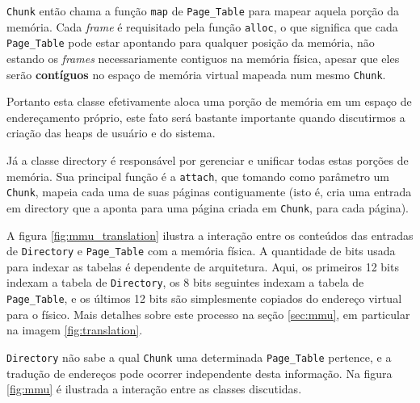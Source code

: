 \verb+Chunk+ então chama a função \verb+map+ de \verb+Page_Table+ para mapear aquela porção da memória. Cada \emph{frame} é requisitado pela função \verb+alloc+, o que significa que cada \verb+Page_Table+ pode estar apontando para qualquer posição da memória, não estando os \emph{frames} necessariamente contiguos na memória física, apesar que eles serão \textbf{contíguos} no espaço de memória virtual mapeada num mesmo \verb+Chunk+.

Portanto esta classe efetivamente aloca uma porção de memória em um espaço de endereçamento próprio, este fato será bastante importante quando discutirmos a criação das heaps de usuário e do sistema.


Já a classe directory é responsável por gerenciar e unificar todas estas porções de memória. Sua principal função é a \verb+attach+, que tomando como parâmetro um \verb+Chunk+, mapeia cada uma de suas páginas contiguamente (isto é, cria uma entrada em directory que a aponta para uma página criada em \verb+Chunk+, para cada página).

A figura \ref{fig:mmu_translation} ilustra a interação entre os conteúdos das entradas de \verb+Directory+ e \verb+Page_Table+ com a memória física. A quantidade de bits usada para indexar as tabelas é dependente de arquitetura. Aqui, os primeiros 12 bits indexam a tabela de \verb+Directory+, os 8 bits seguintes indexam a tabela de \verb+Page_Table+, e os últimos 12 bits são simplesmente copiados do endereço virtual para o físico. Mais detalhes sobre este processo na seção \ref{sec:mmu}, em particular na imagem \ref{fig:translation}.




\verb+Directory+ não sabe a qual \verb+Chunk+ uma determinada \verb+Page_Table+ pertence, e a tradução de endereços pode ocorrer independente desta informação. Na figura \ref{fig:mmu} é ilustrada a interação entre as classes discutidas.





